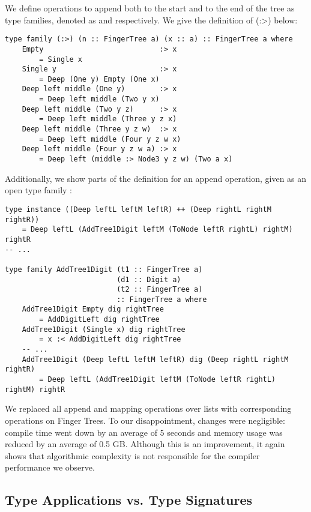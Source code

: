 We define operations to append both to the start and to the end of the tree as type families, denoted as \inline{:<} and \inline{:>} respectively. We give the definition of \inline(:>) below:

\begin{lstlisting}
type family (:>) (n :: FingerTree a) (x :: a) :: FingerTree a where
    Empty                           :> x
        = Single x
    Single y                        :> x
        = Deep (One y) Empty (One x)
    Deep left middle (One y)        :> x
        = Deep left middle (Two y x)
    Deep left middle (Two y z)      :> x
        = Deep left middle (Three y z x)
    Deep left middle (Three y z w)  :> x
        = Deep left middle (Four y z w x)
    Deep left middle (Four y z w a) :> x
        = Deep left (middle :> Node3 y z w) (Two a x)
\end{lstlisting}

Additionally, we show parts of the definition for an append operation, given as an open type family \inline{(++)}:

\begin{lstlisting}
type instance ((Deep leftL leftM leftR) ++ (Deep rightL rightM rightR))
    = Deep leftL (AddTree1Digit leftM (ToNode leftR rightL) rightM) rightR
-- ...

type family AddTree1Digit (t1 :: FingerTree a)
                          (d1 :: Digit a)
                          (t2 :: FingerTree a)
                          :: FingerTree a where
    AddTree1Digit Empty dig rightTree
        = AddDigitLeft dig rightTree
    AddTree1Digit (Single x) dig rightTree
        = x :< AddDigitLeft dig rightTree
    -- ...
    AddTree1Digit (Deep leftL leftM leftR) dig (Deep rightL rightM rightR)
        = Deep leftL (AddTree1Digit leftM (ToNode leftR rightL) rightM) rightR
\end{lstlisting}

We replaced all append and mapping operations over lists with corresponding operations on Finger Trees. To our disappointment, changes were negligible: compile time went down by an average of 5 seconds and memory usage was reduced by an average of 0.5 GB. Although this is an improvement, it again shows that algorithmic complexity is not responsible for the compiler performance we observe.

\subsection{Type Applications vs. Type Signatures}

